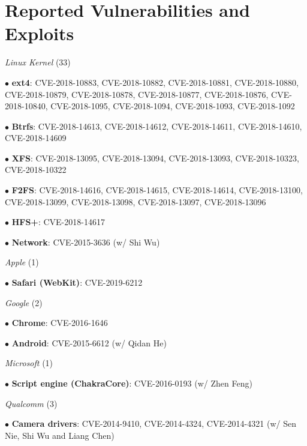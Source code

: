\section*{Reported Vulnerabilities and Exploits}
\begin{description}
\item {\emph{Linux Kernel} (33)}
    \item $\bullet$ \textbf{ext4}: CVE-2018-10883, CVE-2018-10882, CVE-2018-10881, CVE-2018-10880, CVE-2018-10879, CVE-2018-10878, CVE-2018-10877, CVE-2018-10876, CVE-2018-10840, CVE-2018-1095, CVE-2018-1094, CVE-2018-1093, CVE-2018-1092
    \item $\bullet$ \textbf{Btrfs}: CVE-2018-14613, CVE-2018-14612, CVE-2018-14611, CVE-2018-14610, CVE-2018-14609
    \item $\bullet$ \textbf{XFS}: CVE-2018-13095, CVE-2018-13094, CVE-2018-13093, CVE-2018-10323, CVE-2018-10322
    \item $\bullet$ \textbf{F2FS}: CVE-2018-14616, CVE-2018-14615, CVE-2018-14614, CVE-2018-13100, CVE-2018-13099, CVE-2018-13098, CVE-2018-13097, CVE-2018-13096
	\item $\bullet$ \textbf{HFS+}: CVE-2018-14617
	\item $\bullet$ \textbf{Network}: CVE-2015-3636 (w/ Shi Wu)

\item {\emph{Apple} (1)}
    \item $\bullet$ \textbf{Safari (WebKit)}: CVE-2019-6212

\item {\emph{Google} (2)}
    \item $\bullet$ \textbf{Chrome}: CVE-2016-1646
	\item $\bullet$ \textbf{Android}: CVE-2015-6612 (w/ Qidan He)

\item {\emph{Microsoft} (1)}
	\item $\bullet$ \textbf{Script engine (ChakraCore)}: CVE-2016-0193 (w/ Zhen Feng) 

\item {\emph{Qualcomm} (3)}
	\item $\bullet$ \textbf{Camera drivers}: CVE-2014-9410, CVE-2014-4324, CVE-2014-4321 (w/ Sen Nie, Shi Wu and Liang Chen)
\end{description}


